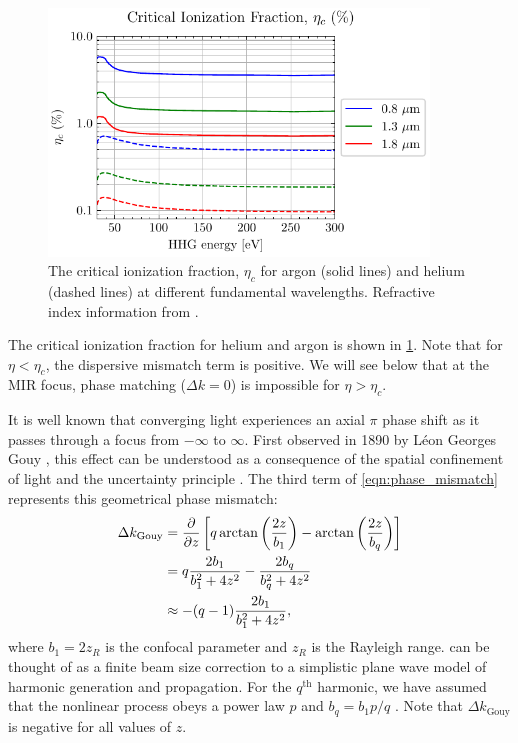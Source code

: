 \begin{figure}
	\centering
	\includegraphics[width=0.9\textwidth]{figures/chap1/crit_ion_frac.pdf}
	\caption{The critical ionization fraction, $\eta_c$ for argon (solid lines) and helium (dashed lines) at different fundamental wavelengths. Refractive index information from \cite{gulliksonCXROXRayInteractions,peckDispersionArgon1964,mansfieldDispersionHelium1969}.}
	\label{fig:crit_ion_frac}
\end{figure}

The critical ionization fraction for helium and argon is shown in \cref{fig:crit_ion_frac}. Note that for $\eta < \eta_c$, the dispersive mismatch term is positive. We will see below that at the MIR focus, phase matching ($\Delta k = 0$) is impossible for $\eta > \eta_c$.

It is well known that converging light experiences an axial $\pi$ phase shift as it passes through a focus from $-\infty$ to $\infty$. First observed in 1890 by L\'{e}on Georges Gouy \cite{gouyPropagationAnomaleOndes1890,gouyProprieteNouvelleOndes1890}, this effect can be understood as a consequence of the spatial confinement of light and the uncertainty principle \cite{boydIntuitiveExplanationPhase1980,fengPhysicalOriginGouy2001}. The third term of \cref{eqn:phase_mismatch} represents this geometrical phase mismatch:
\begin{align}
\label{eqn:gouy_shift}
\begin{split}
\Delta k_{\textrm{Gouy}} &= \pdv{z} \left[ q \arctan\left( \frac{2 z}{b_1} \right) - \arctan \left( \frac{2 z}{b_q} \right) \right] \\
&= q \frac{2 b_1}{b_1^2 + 4 z^2} - \frac{2 b_q}{b_q^2 + 4 z^2} \\
&\approx -(q-1) \frac{2 b_1}{b_1^2 + 4 z^2},
\end{split}
\end{align}
where $b_1 = 2 z_R$ is the confocal parameter and $z_R$ is the Rayleigh range.  can be thought of as a finite beam size correction to a simplistic plane wave model of harmonic generation and propagation. For the $q^{\textrm{th}}$ harmonic, we have assumed that the nonlinear process obeys a power law $p$ and $b_q = b_1 p /q$ \cite{schounAttosecondHighHarmonicSpectroscopy2015}. Note that $\Delta k_{\textrm{Gouy}}$ is negative for all values of $z$.

